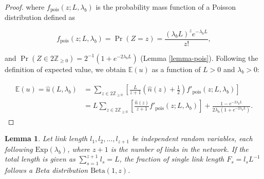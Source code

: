 \documentclass[11pt, class=article, crop=false]{standalone}
\newtheorem{lemma}{Lemma}[subsection]
\theoremstyle{definition}
\begin{document}
\begin{proof}
where $f_{\text{pois}}(z; L, \lambda_b)$ is the probability mass function of a Poisson distribution defined as

\begin{equation}
    f_{\text{pois}}(z; L, \lambda_b) = \Pr(Z = z) = \frac{(\lambda_b L)^{z} e^{-\lambda_b L}}{z!},
\end{equation}

and $\Pr(Z \in 2\mathbb{Z}_{\ge 0}) = 2^{-1}(1 + e^{- 2 \lambda_b L})$ (Lemma \ref{lemma-pois}). 
Following the definition of expected value, we obtain $\mathbb{E}(u)$ as a function of $L > 0$ and $\lambda_b > 0$:

\begin{align}
    \begin{split}
        \mathbb{E}(u) = \hat{u}(L, \lambda_b) 
                    &= \sum_{z \in 2\mathbb{Z}_{\ge 0}} \left[ \frac{L}{z + 1} \left(\hat{n}(z) + \frac{1}{2}\right) f'_{\text{pois}}(z; L, \lambda_b) \right]\\
                    &= L \sum_{z \in 2\mathbb{Z}_{\ge 0}} \left[ \frac{\hat{n}(z)}{z + 1} f'_{\text{pois}}(z; L, \lambda_b)\right] + 
                    \frac{1 - e^{-2 \lambda_b L}}{2 \lambda_b (1 + e^{-2 \lambda_b L})}.
    \end{split}
\end{align}
\end{proof}

\begin{lemma}
\label{lemma-f}
Let link length $l_1, l_2, \ldots, l_{z+1}$ be independent random variables, each following $\mbox{Exp}(\lambda_b)$, where $z+1$ is the number of links in the network.
If the total length is given as $\sum_{s=1}^{z+1} l_s = L$, the fraction of single link length $F_s = l_s L^{-1}$ follows a Beta distribution $\mbox{Beta}(1, z)$.
\end{lemma}
\end{document}
